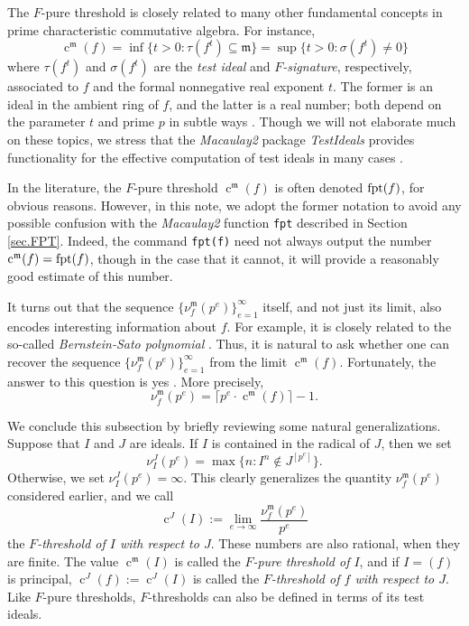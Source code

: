 \documentclass{amsart}
\newcommand{\ft}{\operatorname{c}}
\newcommand{\idealm}{\mathfrak{m}}
\begin{document}
The $F$-pure threshold is closely related to many other fundamental concepts in prime characteristic commutative algebra.   For instance, 
\[ \ft^{\idealm}(f) = \inf \{ t>0 : \tau(f^t)  \subseteq \idealm \} = \sup \{ t>0 : \sigma( f^t) \neq 0 \} \]
where $\tau(f^t)$ and $\sigma(f^t)$ are the \emph{test ideal} and \emph{$F$-signature}, respectively, associated to $f$ and the formal nonnegative real exponent $t$.  The former is an ideal in the ambient ring of $f$, and the latter is a real number;  both depend on the parameter $t$ and prime $p$ in subtle ways \cite{BlickleMustataSmithDiscretenessAndRationalityOfFThresholds, BlickleSchwedeTuckerFSigPairs1}.
Though we will not elaborate much on these topics,  we stress that the \emph{Macaulay2} package \emph{TestIdeals} provides functionality for the effective computation of test ideals in many cases \cite{TestIdealsPackage, TestIdealsPaper}. 

In the literature, the $F$-pure threshold $\ft^{\idealm}(f)$ is often denoted $\operatorname{{fpt}}(f)$, for obvious reasons.  However, in this note, we adopt the former notation to avoid any possible confusion with the \emph{Macaulay2} function {\tt fpt} described in Section \ref{sec.FPT}.  Indeed, the command {\tt fpt(f)} need not always output the number $\ft^{\idealm}(f) = \fpt(f)$, though in the case that it cannot, it will provide a reasonably good estimate of this number.

It turns out that the sequence $\{ \nu_f^{\idealm}(p^e) \}_{e=1}^{\infty}$ itself, and not just its limit, also encodes interesting information about $f$.  For example, it is closely related to the so-called \emph{Bernstein-Sato polynomial} \cite{MustataTakagiWatanabeFThresholdsAndBernsteinSato}.  Thus, it is natural to ask whether one can recover the sequence $\{ \nu_f^{\idealm}(p^e) \}_{e=1}^{\infty}$ from the limit $\ft^{\idealm}(f)$.  Fortunately, the answer to this question is yes \cite{MustataTakagiWatanabeFThresholdsAndBernsteinSato, HernandezFPurityOfHypersurfaces}. More precisely, 
\begin{equation}
\label{sequence-from-limit}
\nu_f^{\idealm}(p^e) = \lceil p^e \cdot \ft^{\idealm}(f) \rceil - 1.  
\end{equation}  

We conclude this subsection by briefly reviewing some natural generalizations.  Suppose that $I$ and $J$ are ideals.  If $I$ is contained in the radical of $J$, then we set
%
\[ \nu_I^J(p^e) = \max \{ n : I^n \notin J^{[p^e]} \}. \]  
Otherwise, we set $\nu_I^J(p^e) = \infty$.  
This clearly generalizes the quantity $\nu_f^{\idealm}(p^e)$ considered earlier, and we call 
\[ \ft^J(I) := \lim_{e \to \infty} \frac{ \nu_f^{\idealm}(p^e)}{p^e} \]
the \emph{$F$-threshold of $I$ with respect to $J$}.  These numbers are also rational, when they are finite.
The value $\ft^{\idealm}(I)$ is called the \emph{$F$-pure threshold of $I$}, and if $I = (f)$ is principal,  $\ft^{J}(f) := \ft^J(I)$ is called the \emph{$F$-threshold of $f$ with respect to $J$}.
Like $F$-pure thresholds, $F$-thresholds can also be defined in terms of its test ideals.
\end{document}

